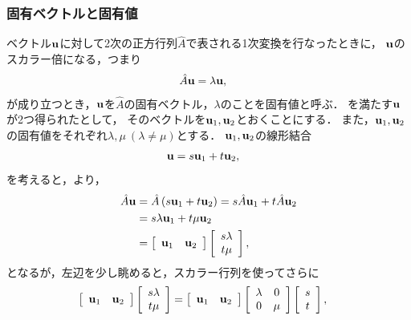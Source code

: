 \subsubsection{固有ベクトルと固有値}
%
ベクトル${\bf u}$に対して2次の正方行列$\hat{A}$で表される1次変換を行なったときに，
${\bf u}$のスカラー倍になる，つまり
%
\begin{align}
\hat{A}{\bf u} & =\lambda{\bf u}, \label{LA:eigen_equation_2D} 
\end{align}
%
が成り立つとき，${\bf u}$を$\hat{A}$の固有ベクトル，$\lambda$のことを固有値と呼ぶ．
を満たす${\bf u}$が2つ得られたとして，
そのベクトルを${\bf u}_{1},{\bf u}_{2}$とおくことにする．
また，${\bf u}_{1},{\bf u}_{2}$の固有値をそれぞれ$\lambda,\mu~(\lambda \neq \mu)$とする．
%
${\bf u}_{1},{\bf u}_{2}$の線形結合
%
\begin{align}
{\bf u} & =s{\bf u}_{1}+t{\bf u}_{2},
\end{align}
%
を考えると，より，
%
\begin{align}
\hat{A}{\bf u} & =\hat{A}\left(s{\bf u}_{1}+t{\bf u}_{2}\right)=s\hat{A}{\bf u}_{1}+t\hat{A}{\bf u}_{2}\notag\\
 & =s\lambda{\bf u}_{1}+t\mu{\bf u}_{2}\notag\\
 & =\left[\begin{array}{cc}
{\bf u}_{1} & {\bf u}_{2}\end{array}\right]\left[\begin{array}{c}
s\lambda\\
t\mu
\end{array}\right],
\end{align}
となるが，左辺を少し眺めると，スカラー行列を使ってさらに
\begin{align}
\left[\begin{array}{cc}
{\bf u}_{1} & {\bf u}_{2}\end{array}\right]\left[\begin{array}{c}
s\lambda\\
t\mu
\end{array}\right] & =\left[\begin{array}{cc}
{\bf u}_{1} & {\bf u}_{2}\end{array}\right]\left[\begin{array}{cc}
\lambda & 0\\
0 & \mu
\end{array}\right]\left[\begin{array}{c}
s\\
t
\end{array}\right],
\end{align}
